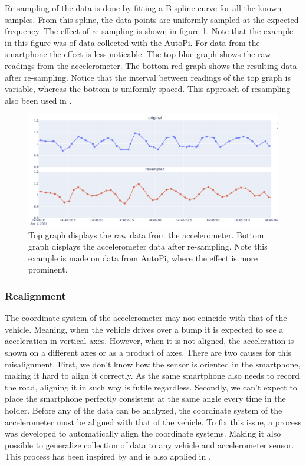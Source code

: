 Re-sampling of the data is done by fitting a B-spline curve for all the known samples. From this spline, the data points are uniformly sampled at the expected frequency. The effect of re-sampling is shown in figure \ref{fig:accelerometer-resampling}. Note that the example in this figure was of data collected with the AutoPi. For data from the smartphone the effect is less noticable. The top blue graph shows the raw readings from the accelerometer. The bottom red graph shows the resulting data after re-sampling. Notice that the interval between readings of the top graph is variable, whereas the bottom is uniformly spaced. This approach of resampling also been used in \cite{Wu2020}.

\begin{figure}[H]
\begin{center}
\includegraphics[width=.95\textwidth,keepaspectratio]{images/4_data/accelerometer-resampling.png}
\end{center}
\captionsetup{width=.95\textwidth}
\caption{Top graph displays the raw data from the accelerometer. Bottom graph displays the accelerometer data after re-sampling. Note this example is made on data from AutoPi, where the effect is more prominent.}
\label{fig:accelerometer-resampling}
\end{figure}


\subsubsection{Realignment}
The coordinate system of the accelerometer may not coincide with that of the vehicle. Meaning, when the vehicle drives over a bump it is expected to see a acceleration in vertical axes. However, when it is not aligned, the acceleration is shown on a different axes or as a product of axes. There are two causes for this misalignment. First, we don't know how the sensor is oriented in the smartphone, making it hard to align it correctly.  As the same smartphone also needs to record the road, aligning it in such way is futile regardless. Secondly, we can't expect to place the smartphone perfectly consistent at the same angle every time in the holder. Before any of the data can be analyzed, the coordinate system of the accelerometer must be aligned with that of the vehicle. To fix this issue, a process was developed to automatically align the coordinate systems. Making it also possible to generalize collection of data to any vehicle and accelerometer sensor. This process has been inspired by \cite{accelerometer_alignment} and is also applied in \cite{Wu2020}. 

